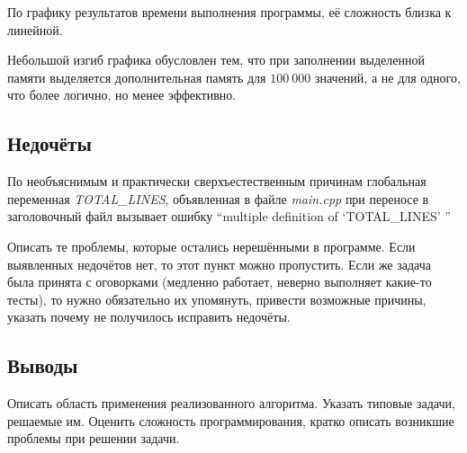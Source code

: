 \documentclass[12pt]{article}
\begin{document}
По графику результатов времени выполнения программы, её сложность близка к линейной.
\newpage


Небольшой изгиб графика обусловлен тем, что при заполнении выделенной памяти выделяется дополнительная память для $100\ 000$ значений, а не для одного, что более логично, но менее эффективно.




\subsection*{Недочёты}

По необъяснимым и практически сверхъестественным причинам глобальная переменная \textit{TOTAL\_LINES}, объявленная в файле {\it main.cpp} при переносе в заголовочный файл вызывает ошибку ``multiple definition of `TOTAL\_LINES' ''

Описать те проблемы, которые остались нерешёнными в программе. Если
выявленных недочётов нет, то этот пункт можно пропустить. Если же
задача была принята с оговорками (медленно работает, неверно выполняет
какие-то тесты), то нужно обязательно их упомянуть, привести возможные
причины, указать почему не получилось исправить недочёты. 

\subsection*{Выводы}

Описать область применения реализованного алгоритма. Указать типовые
задачи, решаемые им. Оценить сложность программирования, кратко
описать возникшие проблемы при решении задачи. 
\end{document}
